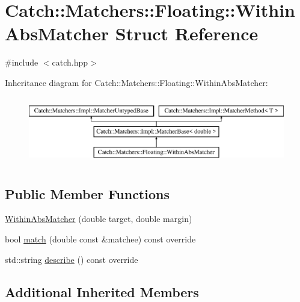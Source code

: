 \hypertarget{struct_catch_1_1_matchers_1_1_floating_1_1_within_abs_matcher}{}\section{Catch\+:\+:Matchers\+:\+:Floating\+:\+:Within\+Abs\+Matcher Struct Reference}
\label{struct_catch_1_1_matchers_1_1_floating_1_1_within_abs_matcher}


{\ttfamily \#include $<$catch.\+hpp$>$}

Inheritance diagram for Catch\+:\+:Matchers\+:\+:Floating\+:\+:Within\+Abs\+Matcher\+:\begin{figure}[H]
\begin{center}
\leavevmode
\includegraphics[height=2.968198cm]{struct_catch_1_1_matchers_1_1_floating_1_1_within_abs_matcher}
\end{center}
\end{figure}
\subsection*{Public Member Functions}
\begin{DoxyCompactItemize}
\item 
\mbox{\hyperlink{struct_catch_1_1_matchers_1_1_floating_1_1_within_abs_matcher_ac45340b98c41230a7def5bd86c2d870f}{Within\+Abs\+Matcher}} (double target, double margin)
\item 
bool \mbox{\hyperlink{struct_catch_1_1_matchers_1_1_floating_1_1_within_abs_matcher_afa5d8eed57f12c1e5d006471eb0bfe72}{match}} (double const \&matchee) const override
\item 
std\+::string \mbox{\hyperlink{struct_catch_1_1_matchers_1_1_floating_1_1_within_abs_matcher_a206a738680f8767af31d3f1835afff3f}{describe}} () const override
\end{DoxyCompactItemize}
\subsection*{Additional Inherited Members}


